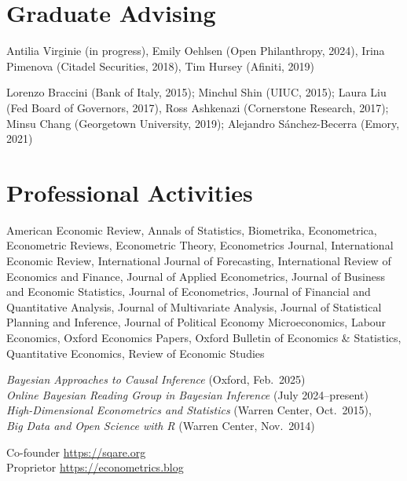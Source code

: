 \documentclass[line,overlapped]{myres}
\begin{document}
\begin{resume}
\section{\sc Graduate Advising}
\begin{description}[style=multiline,leftmargin=3cm,font=\normalfont]
  \item[Main or Joint Supervisor:] Antilia Virginie (in progress), Emily Oehlsen (Open Philanthropy, 2024), Irina Pimenova (Citadel Securities, 2018), Tim Hursey (Afiniti, 2019)
  \item[Committee \\ Member:] Lorenzo Braccini (Bank of Italy, 2015); Minchul Shin (UIUC, 2015); Laura Liu (Fed Board of Governors, 2017), Ross Ashkenazi (Cornerstone Research, 2017); Minsu Chang (Georgetown University, 2019); Alejandro S\'{a}nchez-Becerra (Emory, 2021)
\end{description}


\section{\sc Professional Activities}

\begin{description}[style=multiline,leftmargin=3cm,font=\normalfont]
  \item[Refereeing:] American Economic Review, Annals of Statistics, Biometrika, Econometrica, Econometric Reviews, Econometric Theory, Econometrics Journal, International Economic Review, International Journal of Forecasting, International Review of Economics and Finance, Journal of Applied Econometrics, Journal of Business and Economic Statistics, Journal of Econometrics, Journal of Financial and Quantitative Analysis, Journal of Multivariate Analysis, Journal of Statistical Planning and Inference, Journal of Political Economy Microeconomics, Labour Economics, Oxford Economics Papers, Oxford Bulletin of Economics \& Statistics, Quantitative Economics, Review of Economic Studies 
  \item[Workshops \\ Organized:]
    \emph{Bayesian Approaches to Causal Inference} (Oxford, Feb.\ 2025)\\
    \emph{Online Bayesian Reading Group in Bayesian Inference} (July 2024--present)\\
    \emph{High-Dimensional Econometrics and Statistics} (Warren Center, Oct.\ 2015), \\
    \emph{Big Data and Open Science with R} (Warren Center, Nov.\ 2014)
  \item[Miscellaneous:] Co-founder \url{https://sqare.org}\\ Proprietor \url{https://econometrics.blog}
\end{description}




\end{resume}
\end{document}
